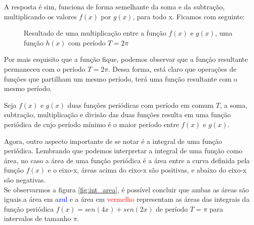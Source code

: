 A resposta é sim, funciona de forma semelhante da soma e da subtração, multiplicando
os valores $f(x)$ por $g(x)$, para todo x. Ficamos com seguinte:
\begin{figure}[H]
    \caption{Resultado de uma multiplicação entre a função $f(x)$ e $g(x)$, uma função $h(x)$ com período $T = 2\pi$}
    \label{fig:multExp}
\end{figure}

Por mais esquisito que a função fique, podemos observar que a função resultante
permaneceu com o período $T = 2\pi$. Dessa forma, está claro que operações 
de funções que partilham um mesmo período, terá uma função resultante com o mesmo
período.\\

\begin{definicao}
    Seja $f(x)$ e $g(x)$ duas funções periódicas com período em comum $T$, a soma, subtração,
    multiplicação e divisão das duas funções resulta em uma função periódica de cujo
    período mínimo é o maior período entre $f(x)$ e $g(x)$.
\end{definicao}

Agora, outro aspecto importante de se notar é a integral de uma função periódica.
Lembrando que podemos interpretar a integral de uma função como área, no caso 
a área de uma função periódica é a área entre a curva definida pela função $f(x)$
e o eixo-x, áreas acima do eixo-x são positivas, e abaixo do eixo-x são negativas.\\

Se observarmos a figura \ref{fig:int_area}, é possível concluir que ambas as 
áreas são iguais.a área em \textcolor{blue}{azul} e a
área em \textcolor{red}{vermelho} representam as áreas das integrais da função
periódica $f(x)=sen(4x)+sen(2x)$ de período $T=\pi$ para intervalos de tamanho $\pi$. 
\\

